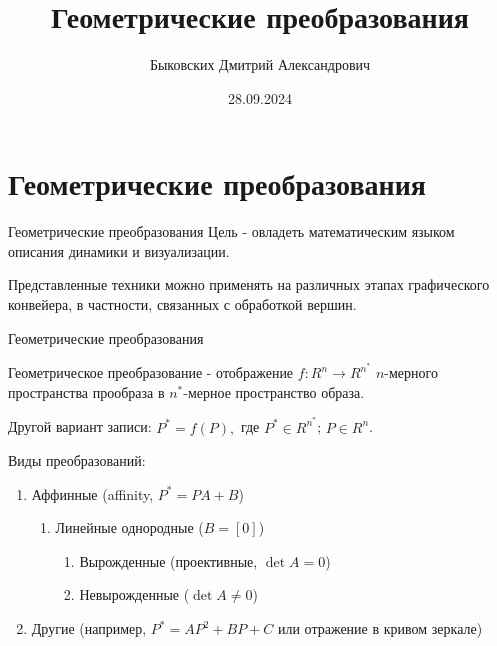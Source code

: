 \documentclass{beamer}
\title[Геометрические преобразования]{Геометрические преобразования}
\author[Быковских Д.А.]{Быковских Дмитрий Александрович}
\date{28.09.2024}
\begin{document}
	\begin{frame}
		\titlepage
	\end{frame}

	\section{Геометрические преобразования}

	\begin{frame}{Геометрические преобразования}
		Цель - овладеть математическим языком описания динамики и визуализации.

		Представленные техники можно применять на различных этапах графического конвейера, в частности, связанных с обработкой вершин.
	\end{frame}

	\begin{frame}{Геометрические преобразования}
				
		Геометрическое преобразование - отображение $f:R^n \to R^{n^{*}}$ $n$-мерного пространства прообраза в $n^{*}$-мерное пространство образа.

		Другой вариант записи:	
		$
			P^{*}=f(P)
			,
		$
		где 
		$P^{*} \in R^{n^{*}}$;
		$P \in R^n $.
		
		Виды преобразований:
		\begin{enumerate}
			\item Аффинные (affinity, $P^{*} = P  A+B$)
				\begin{enumerate}
					\item Линейные однородные ($B = [0]$)
					\begin{enumerate}
						\item Вырожденные (проективные, $\det{A} = 0$)
						\item Невырожденные ($\det{A}\neq 0$)
					\end{enumerate}
				\end{enumerate}
			\item Другие (например, $P^{*}=A P^2+B P+ C$ или отражение в кривом зеркале)
		\end{enumerate}

\end{frame}
\end{document}
